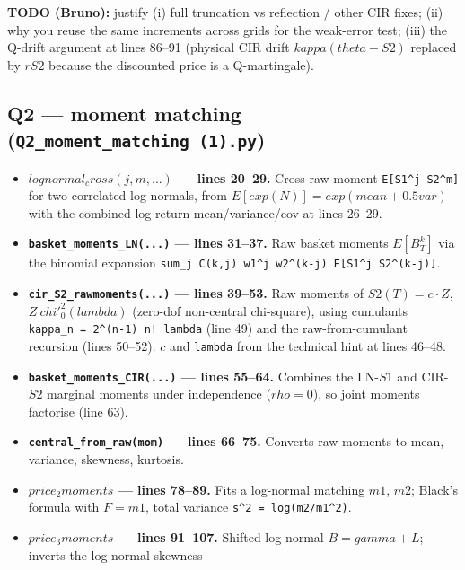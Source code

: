\documentclass[
  11pt,
]{article}
\providecommand{\tightlist}{%
  \setlength{\itemsep}{0pt}\setlength{\parskip}{0pt}}
\begin{document}
\textbf{TODO (Bruno):} justify (i) full truncation vs reflection / other
CIR fixes; (ii) why you reuse the same increments across grids for the
weak-error test; (iii) the Q-drift argument at lines 86--91 (physical
CIR drift \(kappa(theta - S2)\) replaced by \(r S2\) because the
discounted price is a Q-martingale).

\hypertarget{q2-moment-matching-q2_moment_matching-1.py}{%
\subsection{\texorpdfstring{Q2 --- moment matching
(\texttt{Q2\_moment\_matching\ (1).py})}{Q2 --- moment matching (Q2\_moment\_matching (1).py)}}\label{q2-moment-matching-q2_moment_matching-1.py}}

\begin{itemize}
\tightlist
\item
  \textbf{\(lognormal_cross(j, m, ...)\) --- lines 20--29.} Cross raw
  moment \texttt{E{[}S1\^{}j\ S2\^{}m{]}} for two correlated
  log-normals, from \(E[exp(N)] = exp(mean + 0.5 var)\) with the
  combined log-return mean/variance/cov at lines 26--29.
\item
  \textbf{\texttt{basket\_moments\_LN(...)} --- lines 31--37.} Raw
  basket moments \(E[B_T^k]\) via the binomial expansion
  \texttt{sum\_j\ C(k,j)\ w1\^{}j\ w2\^{}(k-j)\ E{[}S1\^{}j\ S2\^{}(k-j){]}}.
\item
  \textbf{\texttt{cir\_S2\_rawmoments(...)} --- lines 39--53.} Raw
  moments of \(S2(T) = c·Z\), \(Z ~ chi'^2_0(lambda)\) (zero-dof
  non-central chi-square), using cumulants
  \texttt{kappa\_n\ =\ 2\^{}(n-1)\ n!\ lambda} (line 49) and the
  raw-from-cumulant recursion (lines 50--52). \(c\) and \texttt{lambda}
  from the technical hint at lines 46--48.
\item
  \textbf{\texttt{basket\_moments\_CIR(...)} --- lines 55--64.} Combines
  the LN-\(S1\) and CIR-\(S2\) marginal moments under independence
  (\(rho=0\)), so joint moments factorise (line 63).
\item
  \textbf{\texttt{central\_from\_raw(mom)} --- lines 66--75.} Converts
  raw moments to mean, variance, skewness, kurtosis.
\item
  \textbf{\(price_2moments\) --- lines 78--89.} Fits a log-normal
  matching \(m1\), \(m2\); Black's formula with \(F = m1\), total
  variance \texttt{s\^{}2\ =\ log(m2/m1\^{}2)}.
\item
  \textbf{\(price_3moments\) --- lines 91--107.} Shifted log-normal
  \(B = gamma + L\); inverts the log-normal skewness

\end{itemize}
\end{document}
